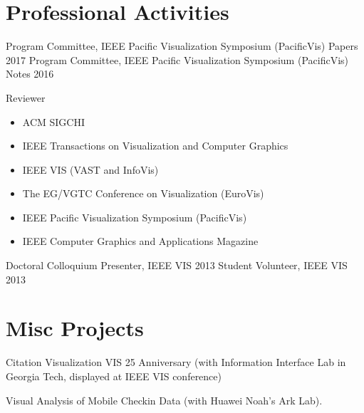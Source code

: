 \documentclass[10pt,a4paper,sans]{moderncv} %
\begin{document}
\section{Professional Activities}

\cvitem{} {Program Committee, IEEE Pacific Visualization Symposium (PacificVis) Papers 2017}
\cvitem{} {Program Committee, IEEE Pacific Visualization Symposium (PacificVis) Notes 2016}
\cvitem{} {Reviewer
\vspace{0.1cm}
\begin{itemize}
\item ACM SIGCHI
\item IEEE Transactions on Visualization and Computer Graphics
\item IEEE VIS (VAST and InfoVis)
\item The EG/VGTC Conference on Visualization (EuroVis)
\item IEEE Pacific Visualization Symposium (PacificVis)
\item IEEE Computer Graphics and Applications Magazine
\end{itemize}}
\cvitem{} {Doctoral Colloquium Presenter, IEEE VIS 2013}
\cvitem{} {Student Volunteer, IEEE VIS 2013}

\section{Misc Projects}
 {Citation Visualization VIS 25 Anniversary \newline{} (with Information Interface Lab in Georgia Tech, displayed at IEEE VIS conference)}

\vspace{0.2cm}

 {Visual Analysis of Mobile Checkin Data (with Huawei Noah's Ark Lab).}
\end{document}
